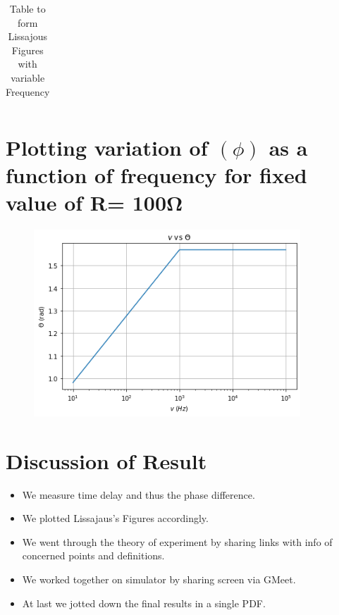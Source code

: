 \documentclass{article}
\begin{document}
\begin{table}[!htp]
\begin{tabular}{  >{\raggedright}m{1cm}  m{1.5cm}  m{1.5cm} m{1.5cm} m{1.5cm} m{1.5cm} m{5cm}  }
\bottomrule
    \end{tabular}

    \caption{Table to form Lissajous Figures with variable Frequency}
    \label{table4.2}
\end{table}
\newpage
\section{Plotting variation  of $(\phi)$ as  a  function  of  frequency  for  fixed  value  of R= 100Ω}
\begin{figure}[h]
    \centering
    \includegraphics[width = 10cm,height = 10cm \textwidth]{v_vs_theta.png}
   
\end{figure}

\section{Discussion of Result}
\begin{itemize}
    \item We measure time delay and thus the phase difference.
    \item We plotted Lissajaus's Figures accordingly.
    \item We went through the theory of experiment by sharing links with info of concerned points and definitions.
    \item We worked together on simulator by sharing screen via GMeet.
    \item At last we jotted down the final results in a single PDF.
\end{itemize}
\end{document}

